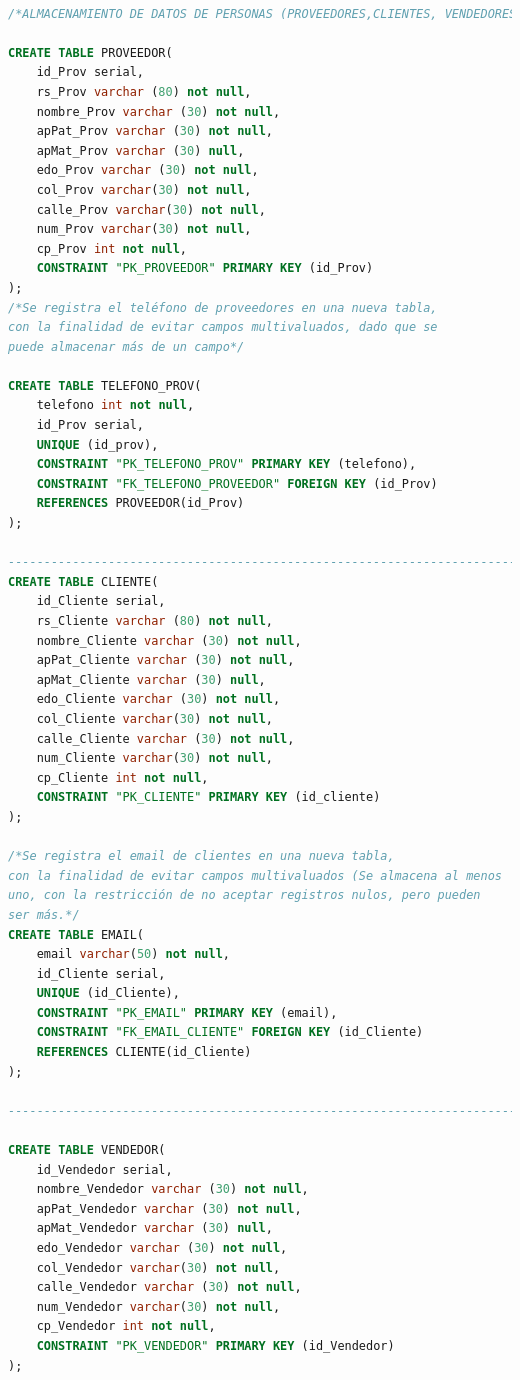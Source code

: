 \documentclass[30pt,fleqn]{article}
\begin{document}

\begin{lstlisting}[language=sql, caption={DDL.Estructura de base de datos Papelería. }]

/*ALMACENAMIENTO DE DATOS DE PERSONAS (PROVEEDORES,CLIENTES, VENDEDORES)*/

CREATE TABLE PROVEEDOR(
    id_Prov serial,
    rs_Prov varchar (80) not null, 
    nombre_Prov varchar (30) not null,
	apPat_Prov varchar (30) not null,
	apMat_Prov varchar (30) null,
	edo_Prov varchar (30) not null,
	col_Prov varchar(30) not null,
	calle_Prov varchar(30) not null,
	num_Prov varchar(30) not null,
	cp_Prov int not null,
	CONSTRAINT "PK_PROVEEDOR" PRIMARY KEY (id_Prov)
);
/*Se registra el teléfono de proveedores en una nueva tabla, 
con la finalidad de evitar campos multivaluados, dado que se
puede almacenar más de un campo*/

CREATE TABLE TELEFONO_PROV(
	telefono int not null,
	id_Prov serial,
	UNIQUE (id_prov),
	CONSTRAINT "PK_TELEFONO_PROV" PRIMARY KEY (telefono),
	CONSTRAINT "FK_TELEFONO_PROVEEDOR" FOREIGN KEY (id_Prov)
	REFERENCES PROVEEDOR(id_Prov)
);

--------------------------------------------------------------------------------
CREATE TABLE CLIENTE(
	id_Cliente serial,
	rs_Cliente varchar (80) not null,
    nombre_Cliente varchar (30) not null,
	apPat_Cliente varchar (30) not null,
	apMat_Cliente varchar (30) null,
	edo_Cliente varchar (30) not null,
	col_Cliente varchar(30) not null,
	calle_Cliente varchar (30) not null,
	num_Cliente varchar(30) not null,
	cp_Cliente int not null,
	CONSTRAINT "PK_CLIENTE" PRIMARY KEY (id_cliente)
);

/*Se registra el email de clientes en una nueva tabla, 
con la finalidad de evitar campos multivaluados (Se almacena al menos
uno, con la restricción de no aceptar registros nulos, pero pueden
ser más.*/
CREATE TABLE EMAIL(
	email varchar(50) not null, 
	id_Cliente serial,
	UNIQUE (id_Cliente),
	CONSTRAINT "PK_EMAIL" PRIMARY KEY (email),
	CONSTRAINT "FK_EMAIL_CLIENTE" FOREIGN KEY (id_Cliente)
	REFERENCES CLIENTE(id_Cliente)
);

--------------------------------------------------------------------------------

CREATE TABLE VENDEDOR(
	id_Vendedor serial,
    nombre_Vendedor varchar (30) not null,
	apPat_Vendedor varchar (30) not null,
	apMat_Vendedor varchar (30) null,
	edo_Vendedor varchar (30) not null,
	col_Vendedor varchar(30) not null,
	calle_Vendedor varchar (30) not null,
	num_Vendedor varchar(30) not null,
	cp_Vendedor int not null,
	CONSTRAINT "PK_VENDEDOR" PRIMARY KEY (id_Vendedor)
);


\end{lstlisting}
\end{document}

